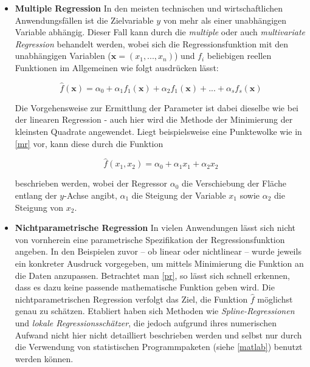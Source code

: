 \begin{itemize}




\item \textbf{Multiple Regression}
In den meisten technischen und wirtschaftlichen Anwendungsfällen ist die Zielvariable $y$ von mehr als einer unabhängigen Variable abhängig. Dieser Fall kann durch die \textit{multiple} oder auch \textit{multivariate Regression} behandelt werden, wobei sich die Regressionsfunktion mit den unabhängigen Variablen ($\boldsymbol{x} = (x_1,...,x_n)$) und $f_i$ beliebigen reellen Funktionen im Allgemeinen wie folgt ausdrücken lässt:

\begin{equation}
	\hat{f}(\boldsymbol{x}) = \alpha_0 + \alpha_1 f_1(\boldsymbol{x}) + \alpha_2 f_1(\boldsymbol{x}) + ... + \alpha_s f_s(\boldsymbol{x}) 
\end{equation}

Die Vorgehensweise zur Ermittlung der Parameter ist dabei dieselbe wie bei der linearen Regression - auch hier wird die Methode der Minimierung der kleinsten Quadrate angewendet. Liegt beispielsweise eine Punktewolke wie in \vref{mr} vor, kann diese durch die Funktion

\begin{equation}
	\hat{f}(x_1,x_2) = \alpha_0 + \alpha_1 x_1 + \alpha_2 x_2
\end{equation}

beschrieben werden, wobei der Regressor $\alpha_0$ die Verschiebung der Fläche entlang der $y$-Achse angibt, $\alpha_1$ die Steigung der Variable $x_1$ sowie $\alpha_2$ die Steigung von $x_2$. 




\item \textbf{Nichtparametrische Regression}
In vielen Anwendungen lässt sich nicht von vornherein eine parametrische Spezifikation der Regressionsfunktion angeben. In den Beispielen zuvor -- ob linear oder nichtlinear -- wurde jeweils ein konkreter Ausdruck vorgegeben, um mittels Minimierung die Funktion an die Daten anzupassen. Betrachtet man \vref{pr}, so lässt sich schnell erkennen, dass es dazu keine passende mathematische Funktion geben wird. Die nichtparametrischen Regression verfolgt das Ziel, die Funktion $\hat{f}$ möglichst genau zu schätzen. Etabliert haben sich Methoden wie \textit{Spline-Regressionen} und \textit{lokale Regressionsschätzer}, die jedoch aufgrund ihres numerischen Aufwand nicht hier nicht detailliert beschrieben werden und selbst nur durch die Verwendung von statistischen Programmpaketen (siehe \vref{matlab}) benutzt werden können.


\end{itemize}
